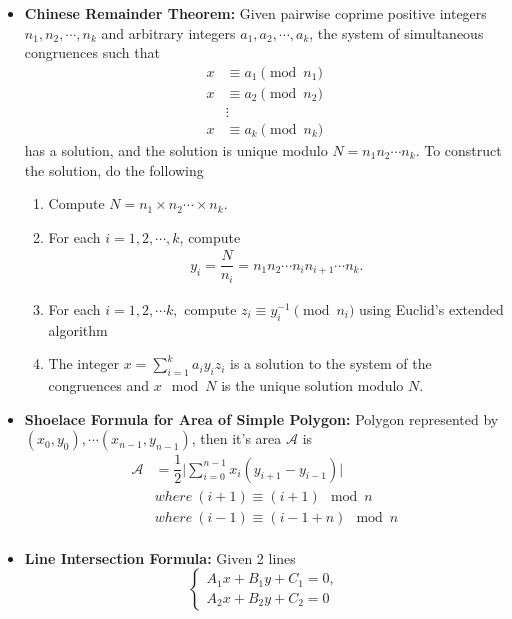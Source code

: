 \documentclass[12pt,a4paper,landscape]{amsart}
\begin{document}
\begin{multicols*}{3}
\begin{itemize}
	\item \textbf{Chinese Remainder Theorem:} Given pairwise coprime positive integers $n_1, n_2, \cdots, n_k$ and arbitrary integers $a_1, a_2, \cdots, a_k$, the system of simultaneous congruences such that
		\begin{align*}
			x &\equiv a_1 \pmod{n_1}\\
			x &\equiv a_2 \pmod{n_2}\\
			  &\vdots\\
			x &\equiv a_k \pmod{n_k}
		\end{align*}
	has a solution, and the solution is unique modulo $N = n_1n_2\cdots n_k$.
	To construct the solution, do the following
		\begin{enumerate}
			\item Compute $N = n_1 \times n_2 \cdots \times n_k$.
			\item For each $i = 1, 2,\cdots,k$, compute
				\begin{align*}
					y_i = \dfrac{N}{n_i} = n_1n_2\cdots n_in_{i + 1}\cdots n_k.
				\end{align*}
			\item For each $i = 1, 2, \cdots k,$ compute $z_i \equiv y_i^{-1} \pmod n_i$ using Euclid's extended algorithm
			\item The integer $x = \sum_{i = 1}^{k} a_iy_iz_i$ is a solution to the system of the congruences and $x \mod{N}$ is the unique solution modulo $N$.
		\end{enumerate}
	\item \textbf{Shoelace Formula for Area of Simple Polygon:} Polygon represented by $(x_0, y_0), \cdots (x_{n - 1}, y_{n - 1})$, then it's area $\mathcal{A}$ is
		\begin{equation*}
		\begin{aligned}
			\mathcal{A} &= \dfrac{1}{2} \bigg|\sum_{i = 0}^{n - 1}x_i(y_{i + 1} - y_{i - 1}) \bigg| \\
						& where\ (i + 1) \equiv (i + 1) \mod {n}\\
						& where\ (i - 1) \equiv (i - 1 + n) \mod {n}\\
		\end{aligned}
		\end{equation*}
	\item \textbf{Line Intersection Formula: } Given 2 lines
	\begin{equation*}
		\begin{cases*}
			A_1x + B_1y + C_1 = 0,\\
			A_2x + B_2y + C_2 = 0
		\end{cases*}

\end{equation*}
\end{itemize}
\end{multicols*}
\end{document}
